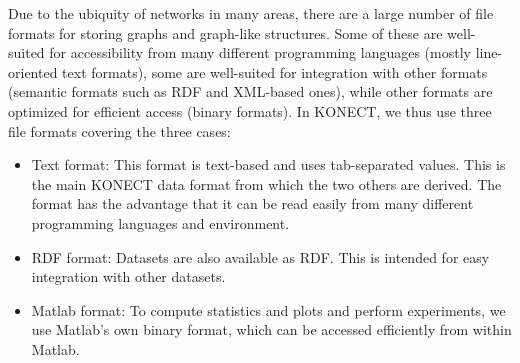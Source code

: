 \documentclass{article}
\begin{document}
Due to the ubiquity of networks in many areas, there are a large number
of file formats for storing graphs and graph-like structures.  Some of
these are well-suited for accessibility from many different programming
languages (mostly line-oriented text formats), some are well-suited for
integration with other formats (semantic formats such as RDF and
XML-based ones), while other formats are optimized for efficient access
(binary formats).  In KONECT, we thus use three file formats covering
the three cases:
\begin{itemize}
\item Text format: This format is text-based and uses tab-separated
  values.  This is the main KONECT data format from which the two others
  are derived.  The format has the advantage that it can be read easily
  from many different programming languages and environment.
\item RDF format: Datasets are also available as RDF.  This is intended
  for easy integration with other datasets.
\item Matlab format: To compute statistics and plots and perform
  experiments, we use Matlab's own binary format, which can be accessed
  efficiently from within Matlab.
\end{itemize}
\end{document}
